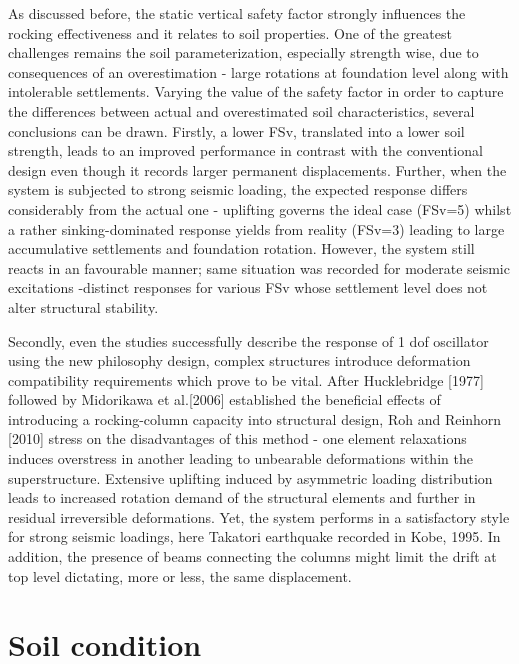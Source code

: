\documentclass[10pt,a4paper]{report}
\begin{document}
As discussed before, the static vertical safety factor strongly influences the rocking effectiveness and it relates to soil properties. One of the greatest challenges remains the soil parameterization, especially strength wise, due to consequences of an overestimation - large rotations at foundation level along with intolerable settlements. Varying the value of the safety factor in order to capture the differences between actual and overestimated soil characteristics, several conclusions can be drawn. Firstly, a lower FSv, translated into a lower soil strength, leads to an improved performance in contrast with the conventional design even though it records larger permanent displacements. Further, when the system is subjected to strong seismic loading, the expected response differs considerably from the actual one - uplifting governs the ideal case (FSv=5) whilst a rather sinking-dominated response yields from reality (FSv=3) leading to large accumulative settlements and foundation rotation. However, the system still reacts in an favourable manner; same situation was recorded for moderate seismic excitations -distinct responses for various FSv whose settlement level does not alter structural stability. 

Secondly, even the studies successfully describe the response of 1 dof oscillator using the new philosophy design, complex structures introduce deformation compatibility requirements which prove to be vital. After Hucklebridge [1977] followed by Midorikawa et al.[2006] established the beneficial effects of introducing a rocking-column capacity into structural design, Roh and Reinhorn [2010] stress on the disadvantages of this method - one element relaxations induces overstress in another leading to unbearable deformations within the superstructure. Extensive uplifting induced by asymmetric loading distribution leads to increased rotation demand of the structural elements and further in residual irreversible deformations. Yet, the system performs in a satisfactory style for strong seismic loadings, here Takatori earthquake recorded in Kobe, 1995. In addition, the presence of beams connecting the columns might limit the drift at top level dictating, more or less, the same displacement.

\section{Soil condition}
\end{document}
